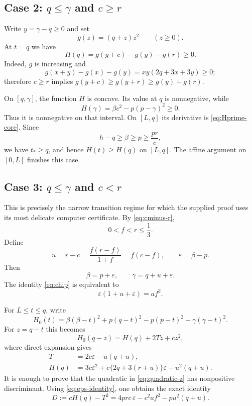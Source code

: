 \documentclass[11pt]{article}
\theoremstyle{remark}
\begin{document}
\subsection*{Case 2: $q\le\gamma$ and $c\ge r$}
Write $y=\gamma-q\ge0$ and set
\[
 g(z)=(q+z)z^2\qquad(z\ge0).
\]
At $t=q$ we have
\begin{equation}\label{eq:Hq-superadd}
 H(q)=g(y+c)-g(y)-g(r)\ge0.
\end{equation}
Indeed, $g$ is increasing and
\[
 g(x+y)-g(x)-g(y)=xy(2q+3x+3y)\ge0;
\]
therefore $c\ge r$ implies
$g(y+c)\ge g(y+r)\ge g(y)+g(r)$.

On $[q,\gamma]$, the function $H$ is concave.  Its value at $q$ is
nonnegative, while
\[
 H(\gamma)=\beta c^2-p(p-\gamma)^2\ge0.
\]
Thus it is nonnegative on that interval.  On $[L,q]$ its derivative is
\eqref{eq:Hprime-core}.  Since
\[
 h-q\ge\beta\ge p\ge\frac{pr}{c},
\]
we have $t_*\ge q$, and hence $H(t)\ge H(q)$ on $[L,q]$.
The affine argument on $[0,L]$ finishes this case.

\subsection*{Case 3: $q\le\gamma$ and $c<r$}
This is precisely the narrow transition regime for which the supplied proof
uses its most delicate computer certificate.  By \eqref{eq:cminus-r},
\begin{equation}\label{eq:f-transition}
 0<f<r\le\frac13.
\end{equation}
Define
\begin{equation}\label{eq:u-eps}
 u=r-c=\frac{f(r-f)}{1+f}=f(c-f),
 \qquad
 \varepsilon=\beta-p.
\end{equation}
Then
\begin{equation}\label{eq:beta-gamma-eps}
 \beta=p+\varepsilon,
 \qquad
 \gamma=q+u+\varepsilon.
\end{equation}
The identity \eqref{eq:chip} is equivalent to
\begin{equation}\label{eq:eps-identity}
 \varepsilon(1+u+\varepsilon)=af^2.
\end{equation}

For $L\le t\le q$, write
\begin{equation}\label{eq:Hcore}
 H_0(t)=
 \beta(\beta-t)^2+p(q-t)^2-p(p-t)^2-\gamma(\gamma-t)^2.
\end{equation}
For $z=q-t$ this becomes
\begin{equation}\label{eq:quadratic-z}
 H_0(q-z)=H(q)+2Tz+cz^2,
\end{equation}
where direct expansion gives
\begin{align}
 T&=2c\varepsilon-u(q+u),                                      \label{eq:T}\\
 H(q)&=3c\varepsilon^2
       +c\{2q+3(r+u)\}\varepsilon-u^2(q+u).                    \label{eq:Hq}
\end{align}
It is enough to prove that the quadratic in \eqref{eq:quadratic-z} has
nonpositive discriminant.  Using \eqref{eq:eps-identity}, one obtains the
exact identity
\begin{equation}\label{eq:Didentity}
 D:=cH(q)-T^2
 =4prc\,\varepsilon-c^2af^2-pu^2(q+u).
\end{equation}
\end{document}
